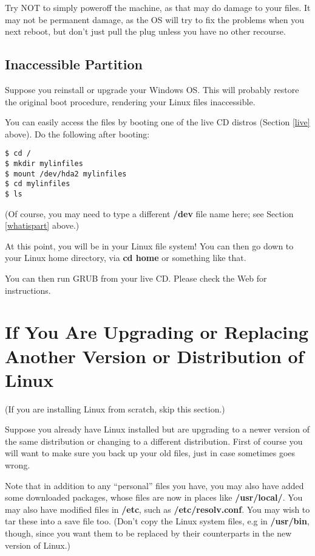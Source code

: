 \documentclass[11pt]{article}
\begin{document}
Try NOT to simply poweroff the machine, as that may do damage to your files.
It may not be permanent damage, as the OS will try to fix the problems
when you next reboot, but don't just pull the plug unless you have no
other recourse.

\subsection{Inaccessible Partition}

Suppose you reinstall or upgrade your Windows OS.  This will probably
restore the original boot procedure, rendering your Linux files
inaccessible.

You can easily access the files by booting one of the live CD distros
(Section \ref{live} above).  Do the following after booting:

\begin{Verbatim}[fontsize=\relsize{-2}]
$ cd /
$ mkdir mylinfiles
$ mount /dev/hda2 mylinfiles
$ cd mylinfiles
$ ls
\end{Verbatim}

(Of course, you may need to type a different {\bf /dev} file name here;
see Section \ref{whatispart} above.)

At this point, you will be in your Linux file system!  You can then go
down to your Linux home directory, via {\bf cd home} or something like
that.

You can then run GRUB from your live CD.  Please check the Web for
instructions.

\section{If You Are Upgrading or Replacing Another Version or
Distribution of Linux}
\label{upgrade} 

(If you are installing Linux from scratch, skip this section.) 

Suppose you already have Linux installed but are upgrading to a newer
version of the same distribution or changing to a different
distribution.  First of course you will want to make sure you back up your
old files, just in case sometimes goes wrong. 

Note that in addition to any ``personal'' files you have, you may also
have added some downloaded packages, whose files are now in places like
{\bf /usr/local/}.  You may also have modified files in {\bf /etc}, such as
{\bf /etc/resolv.conf}.  You may wish to tar these into a save file too.
(Don't copy the Linux system files, e.g in {\bf /usr/bin}, though, since you
want them to be replaced by their counterparts in the new version of
Linux.)
\end{document}
